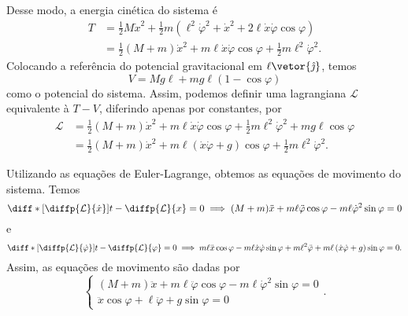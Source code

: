 Desse modo, a energia cinética do sistema é
\begin{align*}
    T &= \frac12 M\dot{x}^2 + \frac12m \left(\ell^2\dot{\varphi}^2 + \dot{x}^2 + 2\ell \dot{x}\dot{\varphi}\cos\varphi\right)\\
      &= \frac12 (M + m) \dot{x}^2 + m\ell \dot{x} \dot\varphi\cos\varphi + \frac12 m\ell^2\dot\varphi^2.
\end{align*}
Colocando a referência do potencial gravitacional em \(\ell \vetor{\hat\jmath}\), temos
\begin{equation*}
    V = Mg\ell + mg\ell(1 - \cos\varphi)
\end{equation*}
como o potencial do sistema. Assim, podemos definir uma lagrangiana \(\mathcal{L}\) equivalente à \(T - V\), diferindo apenas por constantes, por
\begin{align*}
    \mathcal{L} &= \frac12 (M + m) \dot{x}^2 + m\ell \dot{x} \dot\varphi\cos\varphi + \frac12 m\ell^2\dot\varphi^2 + mg \ell \cos\varphi\\
                &= \frac12 (M + m) \dot{x}^2 + m\ell \left(\dot{x} \dot\varphi+ g\right)\cos\varphi + \frac12 m\ell^2\dot\varphi^2.
\end{align*}

Utilizando as equações de Euler-Lagrange, obtemos as equações de movimento do sistema. Temos
\begin{equation*}
    \diff*{{\left[\diffp{\mathcal{L}}{\dot{x}}\right]}}{t} - \diffp{\mathcal{L}}{x} = 0 \implies (M + m) \ddot{x} + m\ell \ddot\varphi \cos\varphi - m\ell\dot\varphi^2\sin\varphi = 0
\end{equation*}
e
\begin{equation*}
    \diff*{{\left[\diffp{\mathcal{L}}{\dot{\varphi}}\right]}}{t} - \diffp{\mathcal{L}}{\varphi} = 0 \implies m \ell \ddot{x} \cos\varphi - m\ell \dot{x}\dot\varphi \sin\varphi + m\ell^2\ddot{\varphi} + m\ell\left(\dot{x}\dot\varphi + g\right)\sin\varphi = 0.
\end{equation*}
Assim, as equações de movimento são dadas por
\begin{equation*}
    \begin{cases}
            (M+m)\ddot{x} + m\ell\ddot\varphi\cos\varphi - m\ell\dot\varphi^2\sin\varphi = 0\\
            \ddot{x}\cos\varphi + \ell\ddot\varphi + g\sin\varphi = 0
    \end{cases}.
\end{equation*}
